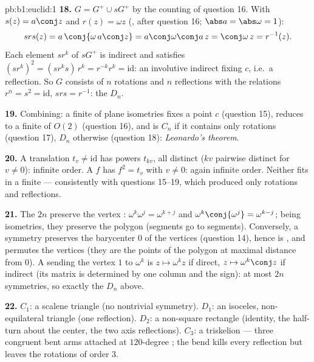\begin{solution}{pb:b1:euclid:1}
\textbf{18.} $G = G^{+} \cup sG^{+}$ by the counting of
question 16. With $s(z) = a\conj z$ and $r(z) = \omega z$
(, after question 16; $\abs a = \abs\omega = 1$):
\[
s r s(z) = a\,\conj{\omega\,a\conj z}
= a\conj\omega\conj a\,z = \conj\omega\,z = r^{-1}(z) .
\]
Each element $sr^k$ of $sG^{+}$ is indirect and satisfies
$(sr^k)^2 = (sr^ks)\,r^k = r^{-k}r^k = \mathrm{id}$: an
involutive indirect  fixing $c$, i.e.\ a reflection. So
$G$ consists of $n$ rotations and $n$ reflections with the
relations $r^n = s^2 = \mathrm{id}$, $srs = r^{-1}$: the
 $D_n$.

\textbf{19.} Combining: a finite  of plane isometries
fixes a point $c$ (question 15), reduces to a finite 
of $O(2)$ (question 16), and is $C_n$ if it contains only
rotations (question 17), $D_n$ otherwise (question 18):
\emph{Leonardo's theorem}.

\textbf{20.} A translation $t_v \neq \mathrm{id}$ has powers
$t_{kv}$, all distinct ($kv$ pairwise distinct for $v \neq 0$):
infinite order. A  $f$ has $f^2 = t_v$ with $v
\neq 0$: again infinite order. Neither fits in a finite 
--- consistently with questions 15--19, which produced only
rotations and reflections.

\textbf{21.} The $2n$  preserve the vertex : $\omega^k
\omega^j = \omega^{k+j}$ and $\omega^k\conj{\omega^j} =
\omega^{k-j}$; being isometries, they preserve the polygon
(segments go to segments). Conversely, a symmetry preserves the
barycenter $0$ of the vertices (question 14), hence is ,
and permutes the vertices (they are the points of the polygon
at maximal distance from $0$). A   sending the
vertex $1$ to $\omega^k$ is $z \mapsto \omega^k z$ if direct,
$z \mapsto \omega^k\conj z$ if indirect (its matrix is
determined by one column and the sign): at most $2n$
symmetries, so exactly the $D_n$ above.

\textbf{22.} $C_1$: a scalene triangle (no nontrivial
symmetry). $D_1$: an isoceles, non-equilateral triangle (one
reflection). $D_2$: a non-square rectangle (identity, the
half-turn about the center, the two axis reflections). $C_3$: a
triskelion --- three congruent bent arms attached at $120$-degree
; the bend kills every reflection but leaves the
rotations of order $3$.


\end{solution}
